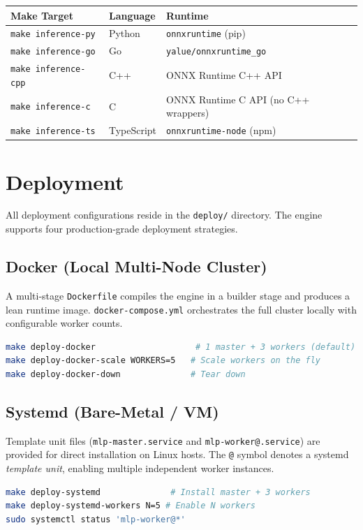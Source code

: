 \documentclass[11pt, a4paper]{article}
\begin{document}
\begin{center}
\begin{tabular}{|l|l|l|}
\hline
\textbf{Make Target} & \textbf{Language} & \textbf{Runtime} \\
\hline
\texttt{make inference-py}  & Python     & \texttt{onnxruntime} (pip) \\
\texttt{make inference-go}  & Go         & \texttt{yalue/onnxruntime\_go} \\
\texttt{make inference-cpp} & C++        & ONNX Runtime C++ API \\
\texttt{make inference-c}   & C          & ONNX Runtime C API (no C++ wrappers) \\
\texttt{make inference-ts}  & TypeScript & \texttt{onnxruntime-node} (npm) \\
\hline
\end{tabular}
\end{center}

\section{Deployment}

All deployment configurations reside in the \texttt{deploy/} directory. The engine supports four production-grade deployment strategies.

\subsection{Docker (Local Multi-Node Cluster)}
A multi-stage \texttt{Dockerfile} compiles the engine in a builder stage and produces a lean runtime image. \texttt{docker-compose.yml} orchestrates the full cluster locally with configurable worker counts.
\begin{lstlisting}[language=bash]
make deploy-docker                    # 1 master + 3 workers (default)
make deploy-docker-scale WORKERS=5   # Scale workers on the fly
make deploy-docker-down              # Tear down
\end{lstlisting}

\subsection{Systemd (Bare-Metal / VM)}
Template unit files (\texttt{mlp-master.service} and \texttt{mlp-worker@.service}) are provided for direct installation on Linux hosts. The \texttt{@} symbol denotes a systemd \textit{template unit}, enabling multiple independent worker instances.
\begin{lstlisting}[language=bash]
make deploy-systemd              # Install master + 3 workers
make deploy-systemd-workers N=5 # Enable N workers
sudo systemctl status 'mlp-worker@*'
\end{lstlisting}
\end{document}
